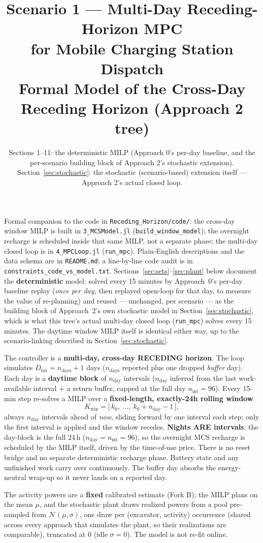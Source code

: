 \documentclass[11pt]{article}
\title{Scenario 1 --- Multi-Day Receding-Horizon MPC\\
       for Mobile Charging Station Dispatch\\[2pt]
       \large Formal Model of the Cross-Day Receding Horizon (Approach 2 tree)}
\author{Sections 1--11: the deterministic MILP (Approach 0's per-day baseline, and the
per-scenario building block of Approach 2's stochastic extension). Section~\ref{sec:stochastic}:
the stochastic (scenario-based) extension itself --- Approach 2's actual closed loop.}
\date{}
\begin{document}
\maketitle

Formal companion to the code in \texttt{Receding\_Horizon/code/}: the cross-day
window MILP is built in \texttt{3\_MCSModel.jl} (\texttt{build\_window\_model}); the
overnight recharge is scheduled inside that same MILP, not a separate phase; the multi-day
closed loop is in \texttt{4\_MPCLoop.jl} (\texttt{run\_mpc}). Plain-English descriptions
and the data schema are in \texttt{README.md}; a line-by-line code audit is in
\texttt{constraints\_code\_vs\_model.txt}. Sections~\ref{sec:sets}--\ref{sec:plant} below
document the \textbf{deterministic} model: solved every 15 minutes by Approach~0's per-day
baseline replay (\emph{once per day}, then replayed open-loop for that day, to measure the
value of re-planning) and reused --- unchanged, per scenario --- as the building block of
Approach~2's own stochastic model in Section~\ref{sec:stochastic}, which is what this tree's
actual multi-day closed loop (\texttt{run\_mpc}) solves every 15 minutes. The daytime window
MILP itself is identical either way, up to the scenario-linking described in
Section~\ref{sec:stochastic}.

The controller is a \textbf{multi-day, cross-day RECEDING horizon}. The loop simulates
$D_{\text{tot}} = n_{\text{days}}+1$ days ($n_{\text{days}}$ reported plus one dropped
\emph{buffer} day). Each day is a \textbf{daytime block} of $n_{\text{day}}$ intervals
($n_{\text{day}}$ inferred from the last work-available interval $+$ a return buffer,
capped at the full day $n_{\text{int}}=96$). Every 15-min step re-solves a MILP over a
\textbf{fixed-length, exactly-24h rolling window}
\[
  K_{\text{win}} = \bigl[\,k_0,\ \dots,\ k_0 + n_{\text{day}} - 1\,\bigr],
\]
always $n_{\text{day}}$ intervals ahead of \emph{now}, sliding forward by one interval each
step; only the first interval is applied and the
window recedes. \textbf{Nights ARE intervals}: the day-block is the full 24\,h
($n_{\text{day}}=n_{\text{int}}=96$), so the overnight MCS recharge is scheduled by the MILP
itself, driven by the time-of-use price. There is no reset bridge and no separate deterministic
recharge phase. Battery state and any unfinished work carry over continuously. The buffer day
absorbs the energy-neutral wrap-up so it never lands on a reported day.

The activity powers are a \textbf{fixed} calibrated estimate (Fork B); the MILP plans on
the mean $\mu$, and the stochastic plant draws realized powers from a pool pre-sampled from
$\mathcal{N}(\mu,\sigma)$, one draw per (excavator, activity) occurrence (shared across every
approach that simulates the plant, so their realizations are comparable), truncated at $0$
(idle $\sigma=0$). The model is not re-fit online.
\end{document}
